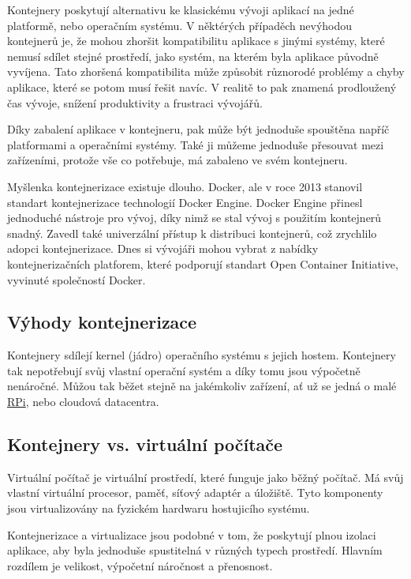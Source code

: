 \documentclass[czech,12pt,a4paper]{article}
\begin{document}
Kontejnery poskytují alternativu ke klasickému vývoji aplikací na jedné platformě, nebo operačním systému. V něktérých případěch nevýhodou kontejnerů je, že mohou zhoršit kompatibilitu aplikace s jinými systémy, které nemusí sdílet stejné prostředí, jako systém, na kterém byla aplikace původně vyvíjena. Tato zhoršená kompatibilita může způsobit různorodé problémy a chyby aplikace, které se potom musí řešit navíc. V realitě to pak znamená prodloužený čas vývoje, snížení produktivity a frustraci vývojářů.

Díky zabalení aplikace v kontejneru, pak může být jednoduše spouštěna napříč platformami a operačními systémy. Také ji můžeme jednoduše přesouvat mezi zařízeními, protože vše co potřebuje, má zabaleno ve svém kontejneru.

Myšlenka kontejnerizace existuje dlouho. Docker, ale v roce 2013 stanovil standart kontejnerizace technologií Docker Engine. Docker Engine přinesl jednoduché nástroje pro vývoj, díky nimž se stal vývoj s použitím kontejnerů snadný. Zavedl také univerzální přístup k distribuci kontejnerů, což zrychlilo adopci kontejnerizace. Dnes si vývojáři mohou vybrat z nabídky kontejnerizačních platforem, které podporují standart Open Container Initiative, vyvinuté společností Docker.

\subsection{Výhody kontejnerizace}

Kontejnery sdílejí kernel (jádro) operačního systému s jejich hostem. Kontejnery tak nepotřebují svůj vlastní operační systém a díky tomu jsou výpočetně nenáročné. Můžou tak běžet stejně na jakémkoliv zařízení, ať už se jedná o malé \underline{\ac{RPi}}, nebo cloudová datacentra.

\subsection{Kontejnery vs. virtuální počítače}

Virtuální počítač je virtuální prostředí, které funguje jako běžný počítač. Má svůj vlastní virtuální procesor, paměť, síťový adaptér a úložiště. Tyto komponenty jsou virtualizovány na fyzickém hardwaru hostujicího systému.

Kontejnerizace a virtualizace jsou podobné v tom, že poskytují plnou izolaci aplikace, aby byla jednoduše spustitelná v různých typech prostředí. Hlavním rozdílem je velikost, výpočetní náročnost a přenosnost.
\end{document}
